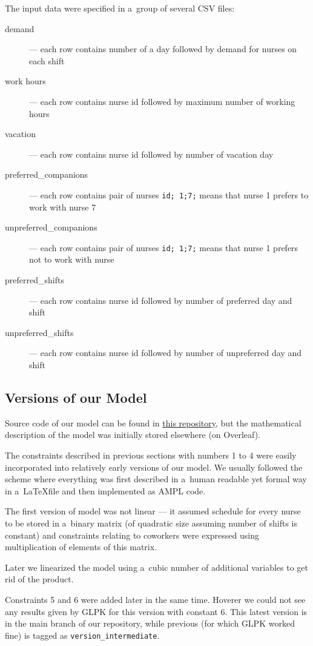 The input data were specified in a~group of several CSV files:

\begin{description}
    \item[demand] --- each row contains number of a day followed by demand for nurses on each shift
    \item[work hours] --- each row contains nurse id followed by maximum number of working hours
    \item[vacation] --- each row contains nurse id followed by number of vacation day
    \item[preferred\_companions] --- each row contains pair of nurses \texttt{id; 1;7;} means that nurse 1 prefers to work with nurse 7
    \item[unpreferred\_companions] --- each row contains pair of nurses \texttt{id; 1;7;} means that nurse 1 prefers not to work with nurse
    \item[preferred\_shifts] --- each row contains nurse id followed by number of preferred day and shift
    \item[unpreferred\_shifts] --- each row contains nurse id followed by number of unpreferred day and shift
\end{description}

\subsection{Versions of our Model}

Source code of our model can be found in \href{https://github.com/szczor/uzytki\_ampl}{this repository}, but the mathematical description of the model was initially stored elsewhere (on Overleaf).

The constraints described in previous sections with numbers 1 to 4 were easily incorporated into relatively early versions of our model. We usually followed the scheme where everything was first described in a~human readable yet formal way in a~\LaTeX file and then implemented as AMPL code.

The first version of model was not linear --- it assumed schedule for every nurse to be stored in a~binary matrix (of quadratic size assuming number of shifts is constant) and constraints relating to coworkers were expressed using multiplication of elements of this matrix.

Later we linearized the model using a~cubic number of additional variables to get rid of the product.

Constraints 5 and 6 were added later in the same time. Hoverer we could not see any results given by GLPK for this version with constant 6. This latest version is in the main branch of our repository, while previous (for which GLPK worked fine) is tagged as \texttt{version\_intermediate}.
